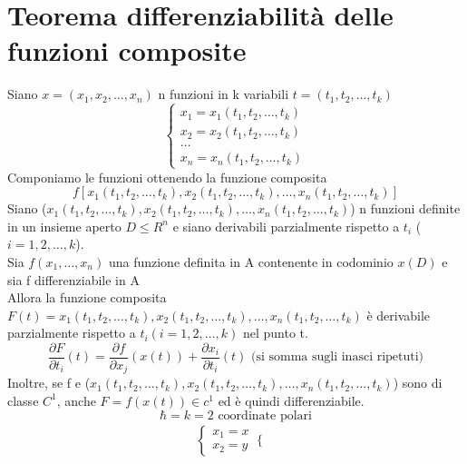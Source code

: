 \section{Teorema differenziabilità delle funzioni composite}
\begin{teorema}
	Siano $x=(x_1,x_2,\dots,x_n)$ n funzioni in k variabili
	$t=(t_1,t_2,\dots,t_k)$
	\begin{equation}
		\begin{cases}
			x_1=x_1(t_1,t_2,\dots,t_k)\\
			x_2=x_2(t_1,t_2,\dots,t_k)\\
			\dots\\
			x_n=x_n(t_1,t_2,\dots,t_k)
		\end{cases}
	\end{equation}
	Componiamo le funzioni ottenendo la funzione composita
	\begin{equation*}
		f[x_1(t_1,t_2,\dots,t_k), x_2(t_1,t_2,\dots,t_k), \dots,
		x_n(t_1,t_2,\dots,t_k)]
	\end{equation*}
	Siano ($x_1(t_1,t_2,\dots,t_k), x_2(t_1,t_2,\dots,t_k), \dots,
		x_n(t_1,t_2,\dots,t_k)$) n funzioni definite in un insieme aperto
		$D\leq R^n$ e siano derivabili parzialmente rispetto a $t_i$
		($i=1,2,\dots, k$).\\
		Sia $f(x_1,\dots,x_n)$ una funzione definita in A contenente in
		codominio $x(D)$ e sia f differenziabile in A\\
	Allora la funzione composita $F(t)=x_1(t_1,t_2,\dots,t_k), x_2(t_1,t_2, 
		\dots,t_k), \dots, x_n(t_1,t_2,\dots,t_k)$ è derivabile parzialmente
		rispetto a $t_i(i=1,2,\dots,k)$ nel punto t.
		\begin{equation*}
			\frac{\partial F}{\partial t_i} (t)=\frac{\partial f}{\partial
			x_j}(x(t))+\frac{\partial x_i}{\partial t_i}(t) \text{ (si somma
			sugli inasci ripetuti)}
		\end{equation*}
		Inoltre, se f e ($x_1(t_1,t_2,\dots,t_k), x_2(t_1,t_2,\dots,t_k), \dots,
		x_n(t_1,t_2,\dots,t_k)$) sono di classe $C^1$, anche $F=f(x(t))\in c^1$
		ed è quindi differenziabile.
		\begin{equation*}
			\hbar=k=2 \text{ coordinate polari}
		\end{equation*}
		\begin{equation*}
			\begin{matrix}
				\begin{cases}
					x_1=x\\
					x_2=y
				\end{cases}
				\begin{cases}

\end{cases}
\end{matrix}
\end{equation*}
\end{teorema}
